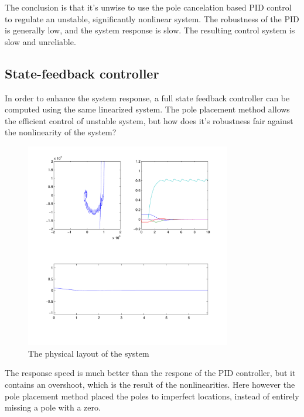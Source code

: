 The conclusion is that it’s unwise to use the pole cancelation based PID control to regulate an unstable, significantly nonlinear system. The robustness of the PID is generally low, and the system response is slow. The resulting control system is slow and unreliable.

\subsection{State-feedback controller}
In order to enhance the system response, a full state feedback controller can be computed using the same linearized system. The pole placement method allows the efficient control of unstable system, but how does it’s robustness fair against the nonlinearity of the system?

\begin{figure}[H]
	\centering
	\includegraphics[width=0.8\textwidth]{img2/Lin01}
	\caption{The physical layout of the system}
	\label{fig:PhysicalLayout}
\end{figure}

The response speed is much better than the respone of the PID controller, but it contains an overshoot, which is the result of the nonlinearities. Here however the pole placement method placed the poles to imperfect locations, instead of entirely missing a pole with a zero.

